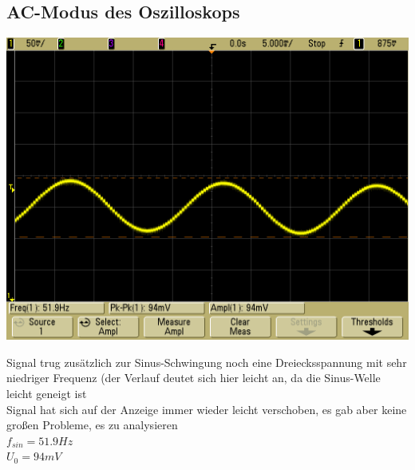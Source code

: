 \documentclass[compress,11pt]{beamer}
\begin{document}
\subsection{AC-Modus des Oszilloskops}
\begin{frame}
\includegraphics[width=.9\textwidth]{../daten/scope_16}
\end{frame}
\begin{frame}
Signal trug zusätzlich zur Sinus-Schwingung noch eine Dreiecksspannung mit sehr niedriger Frequenz (der Verlauf deutet sich hier leicht an, da die Sinus-Welle leicht geneigt ist \\
Signal hat sich auf der Anzeige immer wieder leicht verschoben, es gab aber keine großen Probleme, es zu analysieren\\
$f_{sin} = 51.9 Hz$\\
$U_0 = 94 mV$
\end{frame}
\end{document}
